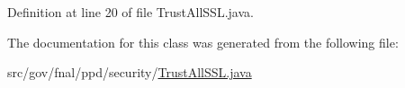 Definition at line 20 of file Trust\-All\-S\-S\-L.\-java.



The documentation for this class was generated from the following file\-:\begin{DoxyCompactItemize}
\item 
src/gov/fnal/ppd/security/\hyperlink{TrustAllSSL_8java}{Trust\-All\-S\-S\-L.\-java}\end{DoxyCompactItemize}

